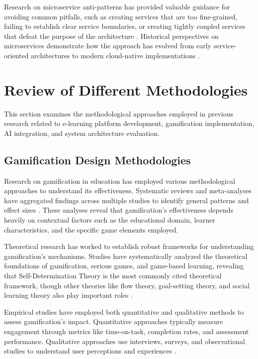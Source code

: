 Research on microservice anti-patterns has provided valuable guidance for avoiding common pitfalls, such as creating services that are too fine-grained, failing to establish clear service boundaries, or creating tightly coupled services that defeat the purpose of the architecture \citep{richards2020}. Historical perspectives on microservices demonstrate how the approach has evolved from early service-oriented architectures to modern cloud-native implementations \citep{richards2020}.

\section{Review of Different Methodologies}
\label{sec:lit-methodologies}

This section examines the methodological approaches employed in previous research related to e-learning platform development, gamification implementation, AI integration, and system architecture evaluation.

\subsection{Gamification Design Methodologies}

Research on gamification in education has employed various methodological approaches to understand its effectiveness. Systematic reviews and meta-analyses have aggregated findings across multiple studies to identify general patterns and effect sizes \citep{oliveira2023}. These analyses reveal that gamification's effectiveness depends heavily on contextual factors such as the educational domain, learner characteristics, and the specific game elements employed.

Theoretical research has worked to establish robust frameworks for understanding gamification's mechanisms. Studies have systematically analyzed the theoretical foundations of gamification, serious games, and game-based learning, revealing that Self-Determination Theory is the most commonly cited theoretical framework, though other theories like flow theory, goal-setting theory, and social learning theory also play important roles \citep{oliveira2023}.

Empirical studies have employed both quantitative and qualitative methods to assess gamification's impact. Quantitative approaches typically measure engagement through metrics like time-on-task, completion rates, and assessment performance. Qualitative approaches use interviews, surveys, and observational studies to understand user perceptions and experiences \citep{oliveira2023}.

